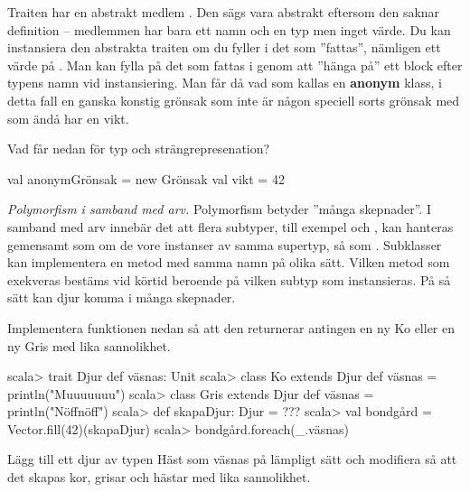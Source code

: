 \Subtask Traiten  har en abstrakt medlem . Den sägs vara abstrakt eftersom den saknar definition -- medlemmen har bara ett namn och en typ men inget värde. Du kan instansiera den abstrakta traiten  om du fyller i det som ''fattas'', nämligen ett värde på . Man kan fylla på det som fattas i genom att ''hänga på'' ett block efter typens namn vid instansiering. Man får då vad som kallas en \textbf{anonym} klass, i detta fall en ganska konstig grönsak som inte är någon speciell sorts grönsak med som ändå har en vikt. 

Vad får  nedan för typ och strängrepresenation?
\begin{REPL}
val anonymGrönsak = new Grönsak { val vikt = 42 }
\end{REPL}



\Task \emph{Polymorfism i samband med arv.} Polymorfism betyder ''många skepnader''. I samband med arv  innebär det att flera subtyper, till exempel  och , kan hanteras gemensamt som om de vore instanser av samma supertyp, så som . Subklasser kan implementera en metod med samma namn på olika sätt. Vilken metod som exekveras bestäms vid körtid beroende på vilken subtyp som instansieras. På så sätt kan djur komma i många skepnader. 

\Subtask Implementera funktionen  nedan så att den returnerar antingen en ny Ko eller en ny Gris med lika sannolikhet.

\begin{REPL}
scala> trait Djur { def väsnas: Unit }
scala> class Ko   extends Djur { def väsnas = println("Muuuuuuu") }
scala> class Gris extends Djur { def väsnas = println("Nöffnöff") }
scala> def skapaDjur: Djur = ??? 
scala> val bondgård = Vector.fill(42)(skapaDjur)
scala> bondgård.foreach(_.väsnas) 
\end{REPL}

\Subtask Lägg till ett djur av typen Häst som väsnas på lämpligt sätt och modifiera  så att det skapas kor, grisar och hästar med lika sannolikhet.



